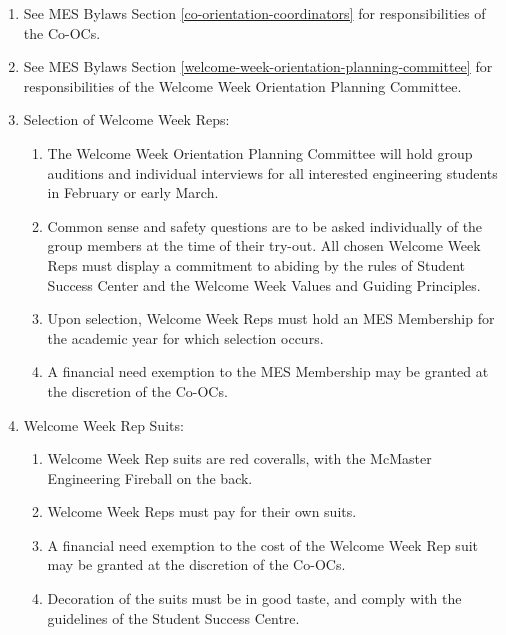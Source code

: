 \begin{enumerate}
 \item
  See MES Bylaws Section \ref{co-orientation-coordinators} for responsibilities of the Co-OCs.
 \item
  See MES Bylaws Section \ref{welcome-week-orientation-planning-committee} 
  for responsibilities of the Welcome Week Orientation Planning Committee.
 \item
  Selection of Welcome Week Reps:

  \begin{enumerate}
   \item
    The Welcome Week Orientation Planning Committee will hold group
    auditions and individual interviews for all interested engineering
    students in February or early March.
   \item
    Common sense and safety questions are to be asked individually of
    the group members at the time of their try-out. All chosen Welcome
    Week Reps must display a commitment to abiding by the rules of
    Student Success Center and the Welcome Week Values and Guiding
    Principles.
   \item
    Upon selection, Welcome Week Reps must hold an MES Membership for
    the academic year for which selection occurs.
   \item
    A financial need exemption to the MES Membership may be granted at
    the discretion of the Co-OCs.
  \end{enumerate}
 \item
  Welcome Week Rep Suits:

  \begin{enumerate}
   \item
    Welcome Week Rep suits are red coveralls, with the McMaster
    Engineering Fireball on the back.
   \item
    Welcome Week Reps must pay for their own suits.
   \item
    A financial need exemption to the cost of the Welcome Week Rep suit
    may be granted at the discretion of the Co-OCs.
   \item
    Decoration of the suits must be in good taste, and comply with the
    guidelines of the Student Success Centre.

  \end{enumerate}
\end{enumerate}

